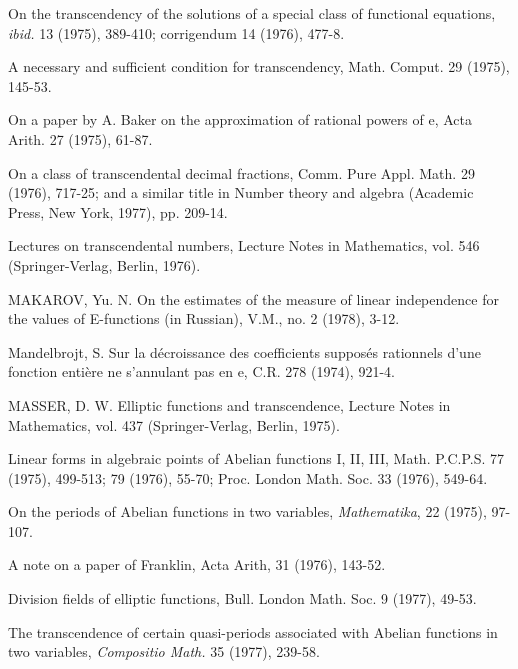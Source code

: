 \begin{hanglist}
    \item \hspace{1.5em} On the transcendency of the solutions of a special class of functional equations, \textit{ibid.} 13 (1975), 389-410; corrigendum 14 (1976), 477-8.
    \item \hspace{1.5em} A necessary and sufficient condition for transcendency, Math. Comput. 29 (1975), 145-53.
    \item \hspace{1.5em} On a paper by A. Baker on the approximation of rational powers of e, Acta Arith. 27 (1975), 61-87.
    \item \hspace{1.5em} On a class of transcendental decimal fractions, Comm. Pure Appl. Math. 29 (1976), 717-25; and a similar title in Number theory and algebra (Academic Press, New York, 1977), pp. 209-14.
    \item \hspace{1.5em} Lectures on transcendental numbers, Lecture Notes in Mathematics, vol. 546 (Springer-Verlag, Berlin, 1976).
    \item MAKAROV, Yu. N. On the estimates of the measure of linear independence for the values of E-functions (in Russian), V.M., no. 2 (1978), 3-12.
    \item Mandelbrojt, S. Sur la décroissance des coefficients supposés rationnels d'une fonction entière ne s'annulant pas en e, C.R. 278 (1974), 921-4.
    \item MASSER, D. W. Elliptic functions and transcendence, Lecture Notes in Mathematics, vol. 437 (Springer-Verlag, Berlin, 1975).
    \item Linear forms in algebraic points of Abelian functions I, II, III, Math. P.C.P.S. 77 (1975), 499-513; 79 (1976), 55-70; Proc. London Math. Soc. 33 (1976), 549-64.
    \item On the periods of Abelian functions in two variables, \textit{Mathematika}, 22 (1975), 97-107.
    \item A note on a paper of Franklin, Acta Arith, 31 (1976), 143-52.
    \item Division fields of elliptic functions, Bull. London Math. Soc. 9 (1977), 49-53.
    \item The transcendence of certain quasi-periods associated with Abelian functions in two variables, \textit{Compositio Math.} 35 (1977), 239-58.

\end{hanglist}
